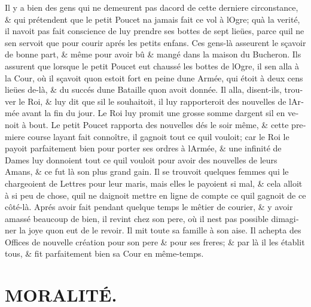\documentclass[14pt,a4paper]{memoir}
\begin{document}
\begin{otherlanguage}{french}
Il y a bien des gens qui ne demeurent pas d\textquotesingle acord de
cette derniere circonstance, \& qui prétendent que le petit Poucet
n\textquotesingle a jamais fait ce vol à l\textquotesingle Ogre;
qu\textquotesingle à la verité, il n\textquotesingle avoit pas fait
conscience de luy prendre ses bottes de sept lieües, parce
qu\textquotesingle il ne s\textquotesingle en servoit que pour courir
aprés les petits enfans. Ces gens-là asseurent le sçavoir de bonne part,
\& même pour avoir bû \& mangé dans la maison du Bucheron. Ils assurent
que lorsque le petit Poucet eut chaussé les bottes de
l\textquotesingle Ogre, il s\textquotesingle en alla à la Cour, où il
sçavoit qu\textquotesingle on estoit fort en peine d\textquotesingle une
Armée, qui étoit à deux cens lieües de-là, \& du succés
d\textquotesingle une Bataille qu\textquotesingle on avoit donnée. Il
alla, disent-ils, trouver le Roi, \& luy dit que s\textquotesingle il le
souhaitoit, il luy rapporteroit des nouvelles de l\textquotesingle Armée
avant la fin du jour. Le Roi luy promit une grosse somme
d\textquotesingle argent s\textquotesingle il en venoit à bout. Le petit
Poucet rapporta des nouvelles dés le soir même, \& cette premiere course
l\textquotesingle ayant fait connoître, il gagnoit tout ce
qu\textquotesingle il vouloit; car le Roi le payoit parfaitement bien
pour porter ses ordres à l\textquotesingle Armée, \& une infinité de
Dames luy donnoient tout ce qu\textquotesingle il vouloit pour avoir des
nouvelles de leurs Amans, \& ce fut là son plus grand gain. Il se
trouvoit quelques femmes qui le chargeoient de Lettres pour leur maris,
mais elles le payoient si mal, \& cela alloit à si peu de chose,
qu\textquotesingle il ne daignoit mettre en ligne de compte ce
qu\textquotesingle il gagnoit de ce côté-là. Aprés avoir fait pendant
quelque temps le mêtier de courier, \& y avoir amassé beaucoup de bien,
il revint chez son pere, où il n\textquotesingle est pas possible
d\textquotesingle imaginer la joye qu\textquotesingle on eut de le
revoir. Il mit toute sa famille à son aise. Il achepta des Offices de
nouvelle création pour son pere \& pour ses freres; \& par là il les
établit tous, \& fit parfaitement bien sa Cour en même-temps.

\section{MORALITÉ.}


\begin{verse}
  \small


\end{verse}
\end{otherlanguage}
\end{document}
